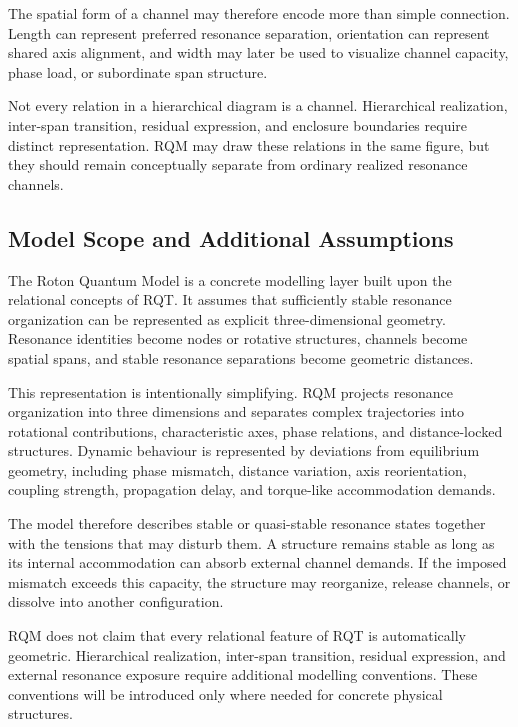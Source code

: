 \documentclass[11pt,a4paper]{article}
\begin{document}
The spatial form of a channel may therefore encode more than simple connection. Length can represent preferred resonance separation, orientation can represent shared axis alignment, and width may later be used to visualize channel capacity, phase load, or subordinate span structure.

Not every relation in a hierarchical diagram is a channel. Hierarchical realization, inter-span transition, residual expression, and enclosure boundaries require distinct representation. RQM may draw these relations in the same figure, but they should remain conceptually separate from ordinary realized resonance channels.


\subsection{Model Scope and Additional Assumptions}

The Roton Quantum Model is a concrete modelling layer built upon the relational concepts of RQT. It assumes that sufficiently stable resonance organization can be represented as explicit three-dimensional geometry. Resonance identities become nodes or rotative structures, channels become spatial spans, and stable resonance separations become geometric distances.

This representation is intentionally simplifying. RQM projects resonance organization into three dimensions and separates complex trajectories into rotational contributions, characteristic axes, phase relations, and distance-locked structures. Dynamic behaviour is represented by deviations from equilibrium geometry, including phase mismatch, distance variation, axis reorientation, coupling strength, propagation delay, and torque-like accommodation demands.

The model therefore describes stable or quasi-stable resonance states together with the tensions that may disturb them. A structure remains stable as long as its internal accommodation can absorb external channel demands. If the imposed mismatch exceeds this capacity, the structure may reorganize, release channels, or dissolve into another configuration.

RQM does not claim that every relational feature of RQT is automatically geometric. Hierarchical realization, inter-span transition, residual expression, and external resonance exposure require additional modelling conventions. These conventions will be introduced only where needed for concrete physical structures.
\end{document}
